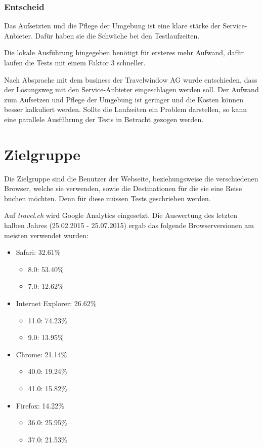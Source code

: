 \subsubsection{Entscheid}
Das Aufsetzten und die Pflege der Umgebung ist eine klare stärke der Service-Anbieter. Dafür haben sie die Schwäche bei den Testlaufzeiten. 

Die lokale Ausführung hingegeben benötigt für ersteres mehr Aufwand, dafür laufen die Tests mit einem Faktor 3 schneller.

Nach Absprache mit dem business der Travelwindow AG wurde entschieden, dass der Lösungsweg mit den  Service-Anbieter eingeschlagen werden soll. Der Aufwand zum Aufsetzen und Pflege der Umgebung ist geringer und die Kosten können besser kalkuliert werden. Sollte die Laufzeiten ein Problem darstellen, so kann eine parallele Ausführung der Tests in Betracht gezogen werden. 

\section{Zielgruppe}
\label{sec:Recherche:Zielgruppe}
Die Zielgruppe sind die Benutzer der Webseite, beziehungsweise die verschiedenen Browser, welche sie verwenden, sowie die Destinationen für die sie eine Reise buchen möchten. Denn für diese müssen Tests geschrieben werden.

Auf \textit{travel.ch} wird Google Analytics eingesetzt. Die Auswertung des letzten halben Jahres (25.02.2015 - 25.07.2015) ergab das folgende Browserversionen am meisten verwendet wurden:
\begin{itemize}
\item Safari: 32.61\%
	\begin{itemize}
			\item 8.0: 53.40\%
			\item 7.0: 12.62\%
	\end{itemize}
\item Internet Explorer: 26.62\%
	\begin{itemize}
			\item 11.0: 74.23\%
			\item 9.0: 13.95\%
	\end{itemize}
\item Chrome: 21.14\%
	\begin{itemize}
			\item 40.0: 19.24\%
			\item 41.0: 15.82\%
	\end{itemize}
\item Firefox: 14.22\%
	\begin{itemize}
			\item 36.0: 25.95\%
			\item 37.0: 21.53\%
	\end{itemize}
\end{itemize}


